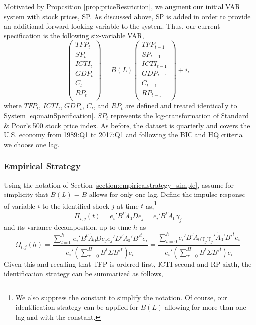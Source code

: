 \documentclass[12pt]{article}
\begin{document}
Motivated by Proposition \ref{prop:priceRestriction}, we augment our initial VAR system with stock prices, SP. As discussed above, SP is added in order to provide an additional forward-looking variable to the system. Thus, our current specification is the following six-variable VAR,
\begin{equation}\label{eq:newsSpecification}
\begin{pmatrix}
TFP_t \\ 
SP_t \\
ICTI_t \\
GDP_t \\
C_t \\
RP_t \\
\end{pmatrix} = B(L) \begin{pmatrix}
TFP_{t-1} \\ 
SP_{t-1} \\
ICTI_{t-1} \\
GDP_{t-1} \\
C_{t-1} \\
RP_{t-1} \\
\end{pmatrix} + i_t
\end{equation}
where $TFP_t$, $ICTI_t$, $GDP_t$, $C_t$, and $RP_t$ are defined and treated identically to System \ref{eq:mainSpecification}. $SP_t$ represents the log-transformation of Standard \& Poor's 500 stock price index.  As before, the dataset is quarterly and covers the U.S. economy from 1989:Q1 to 2017:Q1 and following the BIC and HQ criteria we choose one lag.

\subsubsection*{Empirical Strategy}

Using the notation of Section \ref{section:empiricalstrategy_simple}, assume for simplicity that $B(L) = B$ allows for only one lag. Define the impulse response of variable $i$ to the identified shock $j$ at time $t$ as,\footnote{We also suppress the constant to simplify the notation. Of course, our identification strategy can be applied for $B(L)$ allowing for more than one lag and with the constant.}
$$
\Pi_{i,j}(t) = e_i' B^t \tilde{A}_0 D e_j = e_i' B^t \tilde{A}_0 \gamma_j
$$
and its variance decomposition up to time $h$ as
$$
\Omega_{i,j}(h) = \frac{ \sum_{t=0}^h e_i' B^t \tilde{A}_0 D e_j e_j' D' \tilde{A}_0' B'^t e_i } {e_i'( \sum_{\tau = 0}^H B^t \Sigma B'^t )e_i} = \frac{ \sum_{t=0}^h e_i' B^t \tilde{A}_0 \gamma_j \gamma_j' \tilde{A}_0' B'^t e_i } {e_i'( \sum_{\tau = 0}^H B^t \Sigma B'^t )e_i}
$$
Given this and recalling that TFP is ordered first, ICTI second and RP sixth, the identification strategy can be summarized as follows,
\end{document}
